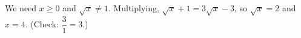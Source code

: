 We need $x\ge0$ and $\sqrt x\ne1$. Multiplying, $\sqrt x+1=3\sqrt x-3$, so $\sqrt x=2$ and $x=\boxed{4}$. (Check: $\dfrac{3}{1}=3$.)

